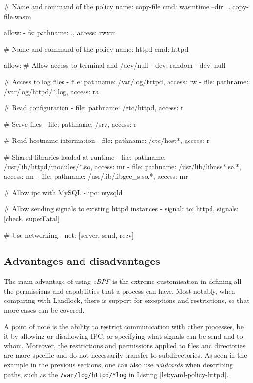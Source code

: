 \begin{code}[language=yaml, caption=Running WASM with BPFContain., label=lst:yaml-policy-wasm]
# Name and command of the policy
name: copy-file
cmd: wasmtime --dir=. copy-file.wasm

allow:
  - fs: {pathname: ., access: rwxm}
\end{code}

\begin{code}[language=yaml, caption=A policy for HTTPD., label=lst:yaml-policy-httpd]
# Name and command of the policy
name: httpd
cmd: httpd

allow:
  # Allow access to terminal and /dev/null
  - dev: random
  - dev: null

  # Access to log files
  - file: {pathname: /var/log/httpd, access: rw}
  - file: {pathname: /var/log/httpd/*.log, access: ra}

  # Read configuration
  - file: {pathname: /etc/httpd, access: r}

  # Serve files
  - file: {pathname: /srv, access: r}

  # Read hostname information
  - file: {pathname: /etc/host*, access: r}

  # Shared libraries loaded at runtime
  - file: {pathname: /usr/lib/httpd/modules/*.so,
           access: mr}
  - file: {pathname: /usr/lib/libnss*.so.*, access: mr}
  - file: {pathname: /usr/lib/libgcc_s.so.*, access: mr}

  # Allow ipc with MySQL
  - ipc: mysqld

  # Allow sending signals to existing httpd instances
  - signal: {to: httpd, signals: [check, superFatal]}

  # Use networking
  - net: [server, send, recv]
\end{code}

\subsection{Advantages and disadvantages}

The main advantage of using \textit{eBPF} is the extreme customisation in defining all the
permissions and capabilities that a process can have. Most notably, when comparing with Landlock,
there is support for exceptions and restrictions, so that more cases can be covered.

A point of note is the ability to restrict communication with other processes, be it by allowing
or disallowing IPC, or specifying what signals can be send and to whom.
Moreover, the restrictions and permissions applied to files and directories are more specific and do not
necessarily transfer to subdirectories. As seen in the example in the previous sections,
one can also use \textit{wildcards} when describing paths, such as the \texttt{/var/log/httpd/*log}
in Listing \ref{lst:yaml-policy-httpd}.

